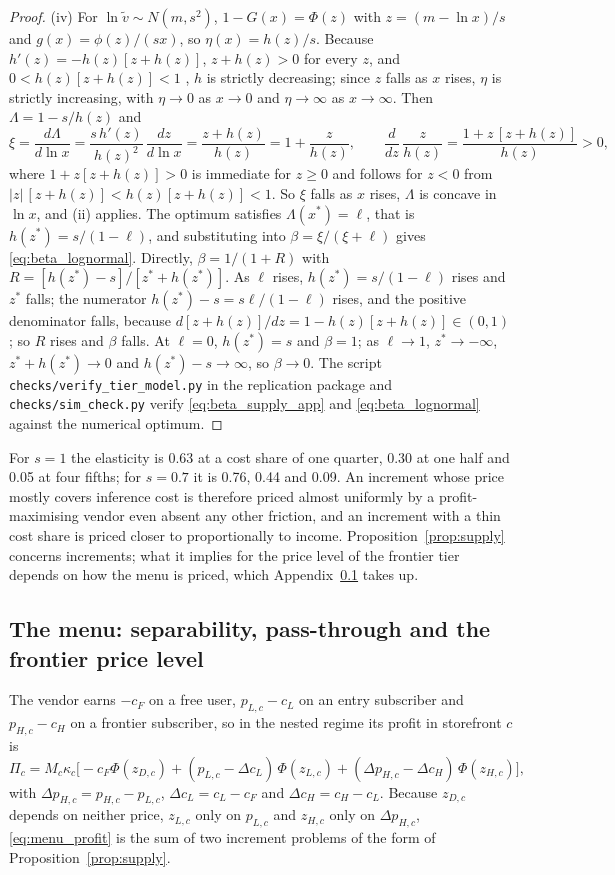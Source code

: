 \documentclass[11pt]{article}
\theoremstyle{definition}
\theoremstyle{remark}
\begin{document}
\begin{proof}
(iv) For $\ln\tilde v\sim N(m,s^2)$, $1-G(x)=\Phi(z)$ with $z=(m-\ln x)/s$ and $g(x)=\phi(z)/(sx)$, so $\eta(x)=h(z)/s$. Because $h'(z)=-h(z)[z+h(z)]$, $z+h(z)>0$ for every $z$, and $0<h(z)[z+h(z)]<1$ \citep{sampford1953some}, $h$ is strictly decreasing; since $z$ falls as $x$ rises, $\eta$ is strictly increasing, with $\eta\to0$ as $x\to0$ and $\eta\to\infty$ as $x\to\infty$. Then $\Lambda=1-s/h(z)$ and
\[
 \xi=\frac{d\Lambda}{d\ln x}=\frac{s\,h'(z)}{h(z)^2}\,\frac{dz}{d\ln x}=\frac{z+h(z)}{h(z)}=1+\frac{z}{h(z)},\qquad \frac{d}{dz}\,\frac{z}{h(z)}=\frac{1+z\,[z+h(z)]}{h(z)}>0,
\]
where $1+z[z+h(z)]>0$ is immediate for $z\ge0$ and follows for $z<0$ from $|z|\,[z+h(z)]<h(z)[z+h(z)]<1$. So $\xi$ falls as $x$ rises, $\Lambda$ is concave in $\ln x$, and (ii) applies. The optimum satisfies $\Lambda(x^*)=\ell$, that is $h(z^*)=s/(1-\ell)$, and substituting into $\beta=\xi/(\xi+\ell)$ gives \eqref{eq:beta_lognormal}. Directly, $\beta=1/(1+R)$ with $R=[h(z^*)-s]/[z^*+h(z^*)]$. As $\ell$ rises, $h(z^*)=s/(1-\ell)$ rises and $z^*$ falls; the numerator $h(z^*)-s=s\ell/(1-\ell)$ rises, and the positive denominator falls, because $d[z+h(z)]/dz=1-h(z)[z+h(z)]\in(0,1)$; so $R$ rises and $\beta$ falls. At $\ell=0$, $h(z^*)=s$ and $\beta=1$; as $\ell\to1$, $z^*\to-\infty$, $z^*+h(z^*)\to0$ and $h(z^*)-s\to\infty$, so $\beta\to0$. The script \nolinkurl{checks/verify_tier_model.py} in the replication package and \nolinkurl{checks/sim_check.py} verify \eqref{eq:beta_supply_app} and \eqref{eq:beta_lognormal} against the numerical optimum.
\end{proof}

For $s=1$ the elasticity is 0.63 at a cost share of one quarter, 0.30 at one half and 0.05 at four fifths; for $s=0.7$ it is 0.76, 0.44 and 0.09. An increment whose price mostly covers inference cost is therefore priced almost uniformly by a profit-maximising vendor even absent any other friction, and an increment with a thin cost share is priced closer to proportionally to income. Proposition~\ref{prop:supply} concerns increments; what it implies for the price level of the frontier tier depends on how the menu is priced, which Appendix~\ref{app:menu} takes up.

\subsection{The menu: separability, pass-through and the frontier price level}\label{app:menu}

The vendor earns $-c_F$ on a free user, $p_{L,c}-c_L$ on an entry subscriber and $p_{H,c}-c_H$ on a frontier subscriber, so in the nested regime its profit in storefront $c$ is
\begin{equation}
 \Pi_c=M_c\kappa_c\Big[-c_F\Phi(z_{D,c})+(p_{L,c}-\Delta c_L)\,\Phi(z_{L,c})+(\Delta p_{H,c}-\Delta c_H)\,\Phi(z_{H,c})\Big],
 \label{eq:menu_profit}
\end{equation}
with $\Delta p_{H,c}=p_{H,c}-p_{L,c}$, $\Delta c_L=c_L-c_F$ and $\Delta c_H=c_H-c_L$. Because $z_{D,c}$ depends on neither price, $z_{L,c}$ only on $p_{L,c}$ and $z_{H,c}$ only on $\Delta p_{H,c}$, \eqref{eq:menu_profit} is the sum of two increment problems of the form of Proposition~\ref{prop:supply}.
\end{document}
